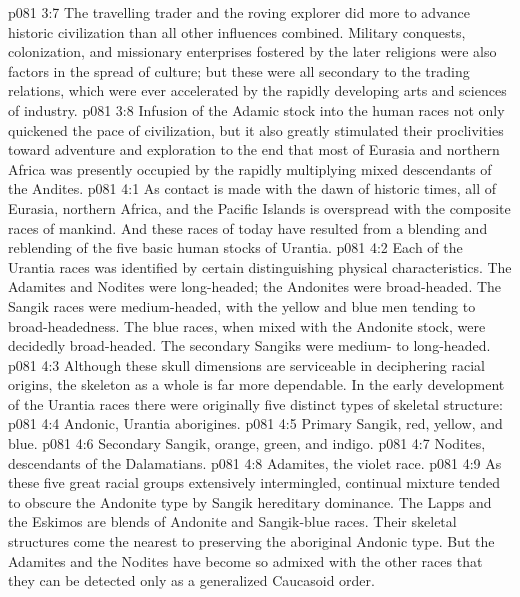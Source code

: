 \vs p081 3:7 The travelling trader and the roving explorer did more to advance historic civilization than all other influences combined. Military conquests, colonization, and missionary enterprises fostered by the later religions were also factors in the spread of culture; but these were all secondary to the trading relations, which were ever accelerated by the rapidly developing arts and sciences of industry.
\vs p081 3:8 Infusion of the Adamic stock into the human races not only quickened the pace of civilization, but it also greatly stimulated their proclivities toward adventure and exploration to the end that most of Eurasia and northern Africa was presently occupied by the rapidly multiplying mixed descendants of the Andites.
\vs p081 4:1 As contact is made with the dawn of historic times, all of Eurasia, northern Africa, and the Pacific Islands is overspread with the composite races of mankind. And these races of today have resulted from a blending and reblending of the five basic human stocks of Urantia.
\vs p081 4:2 Each of the Urantia races was identified by certain distinguishing physical characteristics. The Adamites and Nodites were long\hyp{}headed; the Andonites were broad\hyp{}headed. The Sangik races were medium\hyp{}headed, with the yellow and blue men tending to broad\hyp{}headedness. The blue races, when mixed with the Andonite stock, were decidedly broad\hyp{}headed. The secondary Sangiks were medium\hyp{} to long\hyp{}headed.
\vs p081 4:3 Although these skull dimensions are serviceable in deciphering racial origins, the skeleton as a whole is far more dependable. In the early development of the Urantia races there were originally five distinct types of skeletal structure:
\vs p081 4:4 \bibnobreakspace Andonic, Urantia aborigines.
\vs p081 4:5 \bibnobreakspace Primary Sangik, red, yellow, and blue.
\vs p081 4:6 \bibnobreakspace Secondary Sangik, orange, green, and indigo.
\vs p081 4:7 \bibnobreakspace Nodites, descendants of the Dalamatians.
\vs p081 4:8 \bibnobreakspace Adamites, the violet race.
\vs p081 4:9 \pc As these five great racial groups extensively intermingled, continual mixture tended to obscure the Andonite type by Sangik hereditary dominance. The Lapps and the Eskimos are blends of Andonite and Sangik\hyp{}blue races. Their skeletal structures come the nearest to preserving the aboriginal Andonic type. But the Adamites and the Nodites have become so admixed with the other races that they can be detected only as a generalized Caucasoid order.

